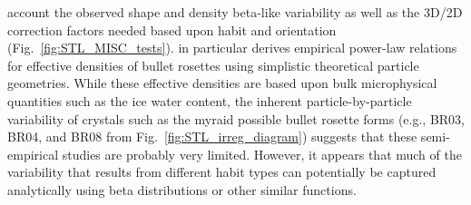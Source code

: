 \documentclass[amt, manuscript]{copernicus}
\begin{document}
account the observed shape and density beta-like variability as well as the 3D/2D correction factors needed based upon habit and orientation (Fig.~\ref{fig:STL_MISC_tests}). \citet{Heymsfield2004} in particular derives empirical power-law relations for effective densities of bullet rosettes using simplistic theoretical particle geometries. While these effective densities are based upon bulk microphysical quantities such as the ice water content, the inherent particle-by-particle variability of crystals such as the myraid possible bullet rosette forms (e.g., BR03, BR04, and BR08 from Fig.~\ref{fig:STL_irreg_diagram}) suggests that these semi-empirical studies are probably very limited. However, it appears that much of the variability that results from different habit types can potentially be captured analytically using beta distributions or other similar functions. 
\end{document}
